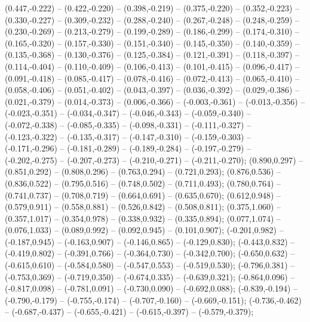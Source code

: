 {\begin{scope}
\begin{scope}[shift={(1.860,0)}]
(0.447,-0.222) -- (0.422,-0.220) -- (0.398,-0.219) -- (0.375,-0.220) -- (0.352,-0.223) -- (0.330,-0.227) -- (0.309,-0.232) -- (0.288,-0.240) -- (0.267,-0.248) -- (0.248,-0.259) -- (0.230,-0.269) -- (0.213,-0.279) -- (0.199,-0.289) -- (0.186,-0.299) -- (0.174,-0.310) -- (0.165,-0.320) -- (0.157,-0.330) -- (0.151,-0.340) -- (0.145,-0.350) -- (0.140,-0.359) -- (0.135,-0.368) -- (0.130,-0.376) -- (0.125,-0.384) -- (0.121,-0.391) -- (0.118,-0.397) -- (0.114,-0.404) -- (0.110,-0.409) -- (0.106,-0.413) -- (0.101,-0.415) -- (0.096,-0.417) -- (0.091,-0.418) -- (0.085,-0.417) -- (0.078,-0.416) -- (0.072,-0.413) -- (0.065,-0.410) -- (0.058,-0.406) -- (0.051,-0.402) -- (0.043,-0.397) -- (0.036,-0.392) -- (0.029,-0.386) -- (0.021,-0.379) -- (0.014,-0.373) -- (0.006,-0.366) -- (-0.003,-0.361) -- (-0.013,-0.356) -- (-0.023,-0.351) -- (-0.034,-0.347) -- (-0.046,-0.343) -- (-0.059,-0.340) -- (-0.072,-0.338) -- (-0.085,-0.335) -- (-0.098,-0.331) -- (-0.111,-0.327) -- (-0.123,-0.322) -- (-0.135,-0.317) -- (-0.147,-0.310) -- (-0.159,-0.303) -- (-0.171,-0.296) -- (-0.181,-0.289) -- (-0.189,-0.284) -- (-0.197,-0.279) -- (-0.202,-0.275) -- (-0.207,-0.273) -- (-0.210,-0.271) -- (-0.211,-0.270);
 (0.890,0.297) -- (0.851,0.292) -- (0.808,0.296) -- (0.763,0.294) -- (0.721,0.293);
 (0.876,0.536) -- (0.836,0.522) -- (0.795,0.516) -- (0.748,0.502) -- (0.711,0.493);
 (0.780,0.764) -- (0.741,0.737) -- (0.708,0.719) -- (0.664,0.691) -- (0.635,0.670);
 (0.612,0.948) -- (0.579,0.911) -- (0.558,0.881) -- (0.526,0.842) -- (0.508,0.811);
 (0.375,1.060) -- (0.357,1.017) -- (0.354,0.978) -- (0.338,0.932) -- (0.335,0.894);
 (0.077,1.074) -- (0.076,1.033) -- (0.089,0.992) -- (0.092,0.945) -- (0.101,0.907);
 (-0.201,0.982) -- (-0.187,0.945) -- (-0.163,0.907) -- (-0.146,0.865) -- (-0.129,0.830);
 (-0.443,0.832) -- (-0.419,0.802) -- (-0.391,0.766) -- (-0.364,0.730) -- (-0.342,0.700);
 (-0.650,0.632) -- (-0.615,0.610) -- (-0.584,0.580) -- (-0.547,0.553) -- (-0.519,0.530);
 (-0.796,0.381) -- (-0.753,0.369) -- (-0.719,0.350) -- (-0.674,0.335) -- (-0.639,0.321);
 (-0.864,0.096) -- (-0.817,0.098) -- (-0.781,0.091) -- (-0.730,0.090) -- (-0.692,0.088);
 (-0.839,-0.194) -- (-0.790,-0.179) -- (-0.755,-0.174) -- (-0.707,-0.160) -- (-0.669,-0.151);
 (-0.736,-0.462) -- (-0.687,-0.437) -- (-0.655,-0.421) -- (-0.615,-0.397) -- (-0.579,-0.379);

\end{scope}
\end{scope}}
